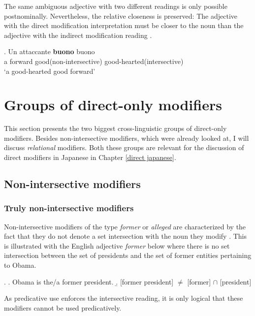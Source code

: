 \documentclass [output=book,colorlinks,citecolor=brown]{langscibook}
\begin{document}
The same ambiguous adjective with two different readings is only possible postnominally. Nevertheless, the relative closeness is preserved: The adjective with the direct modification interpretation must be closer to the noun than the adjective with the indirect modification reading \citep[20–22]{cinque:2010:adj}. %

\exg. Un attaccante \textbf{buono} buono \\
a forward good(non-intersective) good-hearted(intersective)\\
`a good-hearted good forward' \null\hfill \citep[21]{cinque:2010:adj}

\section{Groups of direct-only modifiers} \label{directmodifiers}

This section presents the two biggest cross-linguistic groups of direct-only modifiers. Besides non-intersective modifiers, which were already looked at, I will discuss \textit{relational} modifiers. Both these groups are relevant for the discussion of direct modifiers in Japanese in Chapter \ref{direct japanese}. %

\subsection{Non-intersective modifiers} \label{intersective}

\subsubsection{Truly non-intersective modifiers}

Non-intersective modifiers of the type \textit{former} or \textit{alleged} are characterized by the fact that they do not denote a set intersection with the noun they modify \citep{vendler:1957:verbs, siegel:1976:capturing, bolinger:1967:adj, kamp:1995:prototype, larson:1998:events}. This is illustrated with the English adjective \textit{former} below where there is no set intersection between the set of presidents and the set of former entities pertaining to Obama. %

\ex. \a. Obama is the/a former president.
\b. [former president] $\neq$ [former] $\cap$ [president]

As predicative use enforces the intersective reading, it is only logical that these modifiers cannot be used predicatively.
\end{document}
